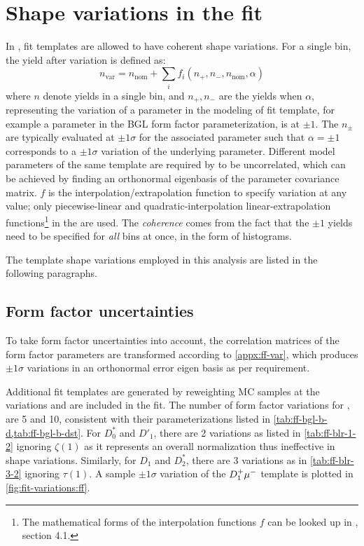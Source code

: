 \section{Shape variations in the fit}
\label{ref:fit:var}

In \HistFactory, fit templates are allowed to have coherent shape variations.
For a single bin, the yield after variation is defined as:
\begin{equation}
    n_\text{var} = n_\text{nom} + \sum_i f_i(n_+, n_-, n_\text{nom}, \alpha)
\end{equation}
where $n$ denote yields in a single bin, and
$n_+, n_-$ are the yields when $\alpha$,
representing the variation of a parameter in the modeling of fit template,
for example a parameter in the BGL form factor parameterization,
is at $\pm 1$.
The $n_\pm$ are typically evaluated at $\pm 1 \sigma$ for the associated
parameter such that $\alpha = \pm 1$ corresponds to a $\pm 1 \sigma$ variation
of the underlying parameter.
Different model parameters of the same template are required by \HistFactory to
be uncorrelated,
which can be achieved by finding an orthonormal eigenbasis of the parameter
covariance matrix.
$f$ is the interpolation/extrapolation function to specify variation
at any value;
only piecewise-linear and quadratic-interpolation linear-extrapolation
functions\footnote{
    The mathematical forms of the interpolation functions $f$ can be looked
    up in \cite{Cranmer:2012sba}, section 4.1.
} in the \HistFactory are used.
The \emph{coherence} comes from the fact that the $\pm 1$ yields need to be
specified for \emph{all} bins at once, in the form of histograms.

The template shape variations employed in this analysis are listed in the
following paragraphs.


\subsection{Form factor uncertainties}

To take form factor uncertainties into account, the correlation
matrices of the form factor parameters are transformed
according to \cref{appx:ff-var}, which produces $\pm 1\sigma$ variations
in an orthonormal error eigen basis as per \HistFactory requirement.

Additional fit templates are generated by reweighting MC samples at the
variations and are included in the fit.
The number of form factor variations for \Dz, \Dstar are 5 and 10,
consistent with their parameterizations listed in
\cref{tab:ff-bgl-b-d,tab:ff-bgl-b-dst}.
For $D_0^*$ and $D'_1$, there are 2 variations as listed
in \cref{tab:ff-blr-1-2}
ignoring $\zeta(1)$ as it
represents an overall normalization thus ineffective in shape variations.
Similarly, for $D_1$ and $D_2^*$, there are 3 variations as
in \cref{tab:ff-blr-3-2}
ignoring $\tau(1)$.
A sample $\pm 1\sigma$ variation of the $D_1^+{\mu^-}$ template is plotted in
\cref{fig:fit-variations:ff}.

